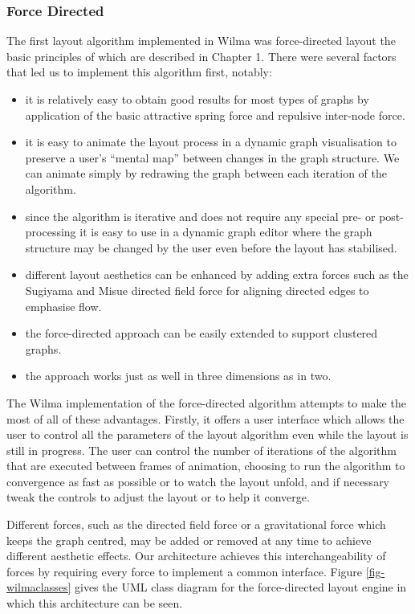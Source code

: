 \documentclass[runningheads]{cl2emult}
\begin{document}
\subsubsection{Force Directed} \label{sec:forcedirectedlayout}
The first layout algorithm implemented in Wilma was force-directed
layout the basic principles of which are described in Chapter
1.  There were several factors that led us to
implement this algorithm first, notably:
\begin{itemize}
\item it is relatively easy to obtain good results for most types of
graphs by application of the basic attractive spring force and
repulsive inter-node force.
\item it is easy to animate the layout process in a dynamic
graph visualisation to preserve a user's ``mental map''\cite{Misue:VLC95}
between changes in the graph structure.  We can animate simply by
redrawing the graph between each iteration of the algorithm.
\item since the algorithm is iterative and does not require any
special pre- or post-processing it is easy to use in a dynamic graph
editor where the graph structure may be changed by the user even
before the layout has stabilised.
\item different layout
aesthetics can be enhanced by adding extra forces such as the Sugiyama and Misue\cite{Sugiyama:VLC95}
directed field force for aligning directed edges to emphasise flow.
\item the force-directed approach can be easily extended to support
clustered graphs\cite{Huang:GD98}.
\item the approach works just as well in three dimensions as in two.
\end{itemize}
The Wilma implementation of the force-directed algorithm attempts to make the most
of all of these advantages.  Firstly, it offers a user interface which
allows the user to control all the parameters of the layout algorithm
even while the layout is still in progress.  The user can control the
number of iterations of the algorithm that are executed between frames
of animation, choosing to run the algorithm to
convergence as fast as possible or to watch the layout unfold, and if
necessary tweak the controls to adjust the layout or to help it
converge.

Different forces, such as the directed field force or
a gravitational force which keeps the graph centred, may be added or removed
at any time to achieve different aesthetic effects.  Our architecture
achieves this interchangeability of forces by requiring every force to
implement a common interface.  Figure
\ref{fig-wilmaclasses} gives the UML class diagram for the
force-directed layout engine in which this architecture can be seen.
\end{document}

